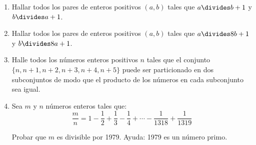 \begin{enumerate}[font={\bfseries},label={\arabic*.}]
\item Hallar todos los pares de enteros positivos $(a,b)$ tales que $a\divides b+1$ y $b\divides a+1$.

\item Hallar todos los pares de enteros positivos $(a,b)$ tales que $a\divides8b+1$ y $b\divides8a+1$.

\item Halle todos los números enteros positivos $n$ tales que el conjunto $\{n,n+1,n+2,n+3,n+4,n+5\}$ puede ser particionado en dos subconjuntos de modo que el producto de los números en cada subconjunto sea igual.

\item Sea $m$ y $n$ números enteros tales que:
\[\frac{m}{n}=1-\frac{1}{2}+\frac{1}{3}-\frac{1}{4}+\cdots-\frac{1}{1318}+\frac{1}{1319}\]

Probar que $m$ es divisible por 1979. Ayuda: 1979 es un número primo.
\end{enumerate}